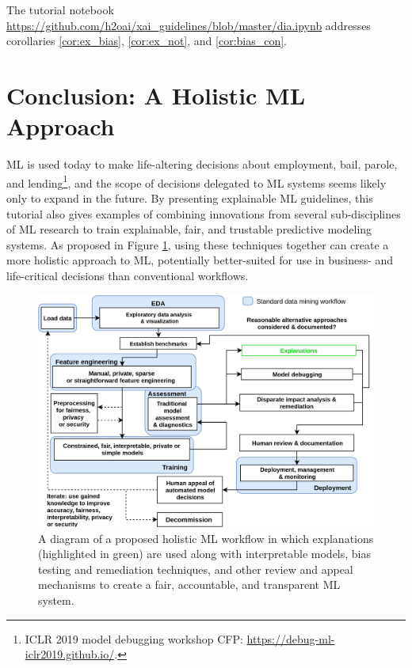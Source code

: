 \documentclass[sigconf]{acmart}
\begin{document}
\vspace{-8pt}
\noindent The tutorial notebook \url{https://github.com/h2oai/xai_guidelines/blob/master/dia.ipynb} addresses corollaries \ref{cor:ex_bias}, \ref{cor:ex_not}, and \ref{cor:bias_con}. 

\section{Conclusion: A Holistic ML Approach} \label{sec:conclusion}

ML is used today to make life-altering decisions about employment, bail, parole, and lending\footnote{ICLR 2019 model debugging workshop CFP: \url{https://debug-ml-iclr2019.github.io/}.}, and the scope of decisions delegated to ML systems seems likely only to expand in the future. By presenting explainable ML guidelines, this tutorial also gives examples of combining innovations from several sub-disciplines of ML research to train explainable, fair, and trustable predictive modeling systems. As proposed in Figure \ref{fig:hc_ml}, using these techniques together can create a more holistic approach to ML, potentially better-suited for use in business- and life-critical decisions than conventional workflows.

\begin{figure}[htb!]
	\begin{center}
		\includegraphics[scale=0.1]{img/hc_ml.png}
		\caption{A diagram of a proposed holistic ML workflow in which explanations (highlighted in green) are used along with interpretable models, bias testing and remediation techniques, and other review and appeal mechanisms to create a fair, accountable, and transparent ML system.}
		\label{fig:hc_ml}
	\end{center}
\end{figure}
\end{document}
